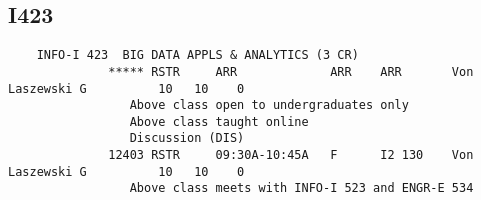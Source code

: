 \subsection{I423}


\begin{verbatim}
	INFO-I 423  BIG DATA APPLS & ANALYTICS (3 CR)
              ***** RSTR     ARR             ARR    ARR       Von Laszewski G          10   10    0
                 Above class open to undergraduates only
                 Above class taught online
                 Discussion (DIS)
              12403 RSTR     09:30A-10:45A   F      I2 130    Von Laszewski G          10   10    0
                 Above class meets with INFO-I 523 and ENGR-E 534
\end{verbatim}